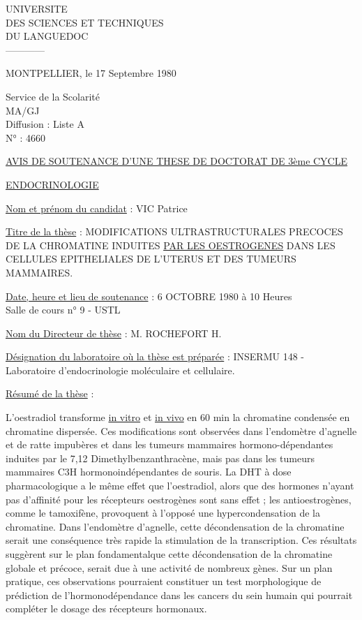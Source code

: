 UNIVERSITE\\
DES SCIENCES ET TECHNIQUES\\
DU LANGUEDOC\\
------------

MONTPELLIER, le 17 Septembre 1980

Service de la Scolarité\\
MA/GJ\\
Diffusion : Liste A\\
N° : 4660

\uline{AVIS DE SOUTENANCE D'UNE THESE DE DOCTORAT DE 3ème CYCLE}

\uline{ENDOCRINOLOGIE}

\uline{Nom et prénom du candidat} : VIC Patrice

\uline{Titre de la thèse} : MODIFICATIONS ULTRASTRUCTURALES PRECOCES DE LA CHROMATINE INDUITES \uline{PAR LES OESTROGENES} DANS LES CELLULES EPITHELIALES DE L'UTERUS ET DES TUMEURS MAMMAIRES.

\uline{Date, heure et lieu de soutenance} : 6 OCTOBRE 1980 à 10 Heures\\
Salle de cours n° 9 - USTL

\uline{Nom du Directeur de thèse} : M. ROCHEFORT H.

\uline{Désignation du laboratoire où la thèse est préparée} : INSERMU 148 - Laboratoire d'endocrinologie moléculaire et cellulaire.

\uline{Résumé de la thèse} :

L'oestradiol transforme \uline{in vitro} et \uline{in vivo} en 60 min la chromatine condensée en chromatine dispersée. Ces modifications sont observées dans l'endomètre d'agnelle et de ratte impubères et dans les tumeurs mammaires hormono-dépendantes induites par le 7,12 Dimethylbenzanthracène, mais pas dans les tumeurs mammaires C3H hormonoindépendantes de souris. La DHT à dose pharmacologique a le même effet que l'oestradiol, alors que des hormones n'ayant pas d'affinité pour les récepteurs oestrogènes sont sans effet ; les antioestrogènes, comme le tamoxifène, provoquent à l'opposé une hypercondensation de la chromatine. Dans l'endomètre d'agnelle, cette décondensation de la chromatine serait une conséquence très rapide la stimulation de la transcription. Ces résultats suggèrent sur le plan fondamental\unsure{:}que cette décondensation de la chromatine globale et précoce, serait due à une activité de nombreux gènes. Sur un plan pratique, ces observations pourraient constituer un test morphologique de prédiction de l'hormonodépendance dans les cancers du sein humain qui pourrait compléter le dosage des récepteurs hormonaux.

